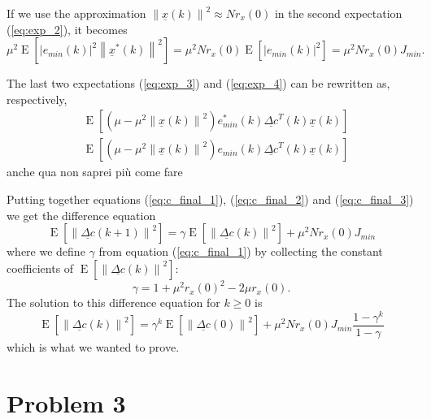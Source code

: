 \documentclass{article}
\renewcommand{\vec}[1]{\underline{#1}}
\newcommand{\E}[1]{\operatorname{E}\left[#1\right]}
\newcommand{\norm}[1]{\left\lVert#1\right\rVert}
\newcommand{\abs}[1]{\left|#1\right|}
\begin{document}
If we use the approximation $\norm{\vec{x}(k)}^2 \approx Nr_x(0)$ in
the second expectation (\ref{eq:exp_2}), it becomes
\begin{equation}
\mu^2 \E{\abs{e_{min}(k)}^2 \norm{\vec{x}^*(k)}^2}
= \mu^2Nr_x(0)\E{\abs{e_{min}(k)}^2}
= \mu^2Nr_x(0)J_{min} .
\label{eq:c_final_2}
\end{equation}

The last two expectations (\ref{eq:exp_3}) and (\ref{eq:exp_4}) can be
rewritten as, respectively,
\begin{align*}
  & \E{\left(\mu - \mu^2\norm{\vec{x}(k)}^2\right) e_{min}^*(k) \vec{\Delta c}^T(k)\vec{x}(k)} \\
  & \E{\left(\mu - \mu^2\norm{\vec{x}(k)}^2\right) e_{min}(k) \vec{\Delta c}^T(k)\vec{x}(k)}
\end{align*}
    {\color{red} anche qua non saprei più come fare}

Putting together equations (\ref{eq:c_final_1}), (\ref{eq:c_final_2})
and (\ref{eq:c_final_3}) we get the difference equation
\begin{equation}
  \E{\norm{\vec{\Delta c}(k+1)}^2} = \gamma \E{\norm{\vec{\Delta
        c}(k)}^2} + \mu^2Nr_x(0)J_{min}
\end{equation}
where we define $\gamma$ from equation (\ref{eq:c_final_1}) by
collecting the constant coefficients of $\E{\norm{\vec{\Delta c}(k)}^2}$:
\[ \gamma = 1 + \mu^2r_x(0)^2 - 2\mu r_x(0) . \]
The solution to this difference equation for $k \geq 0$ is
\begin{equation}
  \E{\norm{\vec{\Delta c}(k)}^2} =
  \gamma^k \E{\norm{\vec{\Delta c}(0)}^2} +
  \mu^2Nr_x(0)J_{min} \frac{1 - \gamma^k}{1 - \gamma}
\end{equation}
which is what we wanted to prove.
\section*{Problem 3}
\end{document}
